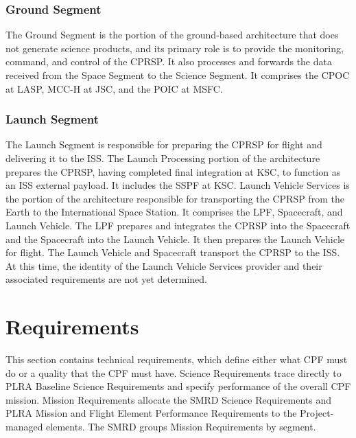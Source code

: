 \documentclass[12pt,oneside,oldfontcommands]{memoir}
\begin{document}
\subsection{Ground Segment }
\label{groundsegment}

The Ground Segment is the portion of the ground-based architecture that does not generate science products, and its primary role is to provide the monitoring, command, and control of the \gls{CPRSP}. It also processes and forwards the data received from the Space Segment to the Science Segment. It comprises the \gls{CPOC} at \gls{LASP}, \gls{MCC-H} at \gls{JSC}, and the \gls{POIC} at \gls{MSFC}.

\subsection{Launch Segment }
\label{launchsegment}

The Launch Segment is responsible for preparing the \gls{CPRSP} for flight and delivering it to the \gls{ISS}. The Launch Processing portion of the architecture prepares the \gls{CPRSP}, having completed final integration at \gls{KSC}, to function as an \gls{ISS} external payload. It includes the \gls{SSPF} at \gls{KSC}. Launch Vehicle Services is the portion of the architecture responsible for transporting the \gls{CPRSP} from the Earth to the International Space Station. It comprises the \gls{LPF}, Spacecraft, and Launch Vehicle. The \gls{LPF} prepares and integrates the \gls{CPRSP} into the Spacecraft and the Spacecraft into the Launch Vehicle. It then prepares the Launch Vehicle for flight. The Launch Vehicle and Spacecraft transport the \gls{CPRSP} to the \gls{ISS}. At this time, the identity of the Launch Vehicle Services provider and their associated requirements are not yet determined.

\chapter{Requirements  }
\label{sec_req}

\renewcommand\labelitemi{}

This section contains technical requirements, which define either what \gls{CPF} must do or a quality that the \gls{CPF} must have. Science Requirements trace directly to PLRA Baseline Science Requirements and specify performance of the overall \gls{CPF} mission. Mission Requirements allocate the \gls{SMRD} Science Requirements and PLRA Mission and Flight Element Performance Requirements to the Project-managed elements. The \gls{SMRD} groups Mission Requirements by segment.
\end{document}
